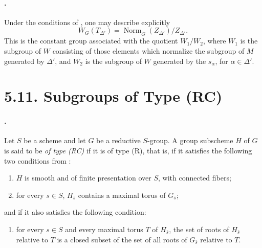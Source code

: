 \paragraph{.}
Under the conditions of , one may describe explicitly
\[
  W_G(T_{\Delta'})
  =
  \underline{\operatorname{Norm}}_G(Z_{\Delta'})/Z_{\Delta'}.
\]
This is the constant group associated with the quotient \(W_1/W_2\),
where \(W_1\) is the subgroup of \(W\) consisting of those elements
which normalize the subgroup of \(M\) generated by \(\Delta'\), and
\(W_2\) is the subgroup of \(W\) generated by the \(s_\alpha\), for
\(\alpha\in\Delta'\).

\section*{5.11. Subgroups of Type \textup{(RC)}}

\paragraph{.}
Let \(S\) be a scheme and let \(G\) be a reductive \(S\)-group. A
group subscheme \(H\) of \(G\) is said to be \emph{of type
\textup{(RC)}} if it is of type \textup{(R)}, that is, if it
satisfies the following two conditions from :
\begin{enumerate}
\item[\textup{(i)}] \(H\) is smooth and of finite presentation over
\(S\), with connected fibers;

\item[\textup{(ii)}] for every \(s\in S\), \(H_{\bar s}\) contains
a maximal torus of \(G_{\bar s}\);
\end{enumerate}
and if it also satisfies the following condition:
\begin{enumerate}
\item[\textup{\SGAInlineRefTarget{sga3:xxii:def:5.11.1:item:iii}(iii)}] for every \(s\in S\) and every maximal torus
\(T\) of \(H_{\bar s}\), the set of roots of \(H_{\bar s}\)
relative to \(T\) is a closed subset of the set of all roots of
\(G_{\bar s}\) relative to \(T\).
\end{enumerate}

